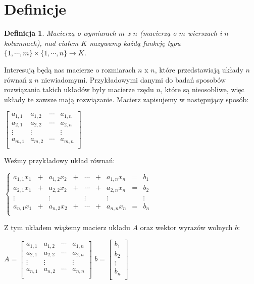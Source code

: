 \documentclass[a4paper,10pt]{article}
\newtheorem{definition}{Definicja}
\begin{document}
\section{Definicje}
\begin{definition}
	Macierzą o wymiarach $m$ x $n$ (macierzą o $m$ wierszach i $n$ kolumnach), nad ciałem $K$ nazywamy każdą funkcję typu $\{1,\cdots,m\} \times \{1,\cdots,n\} \rightarrow K$.
\end{definition}
Interesują będą nas macierze o rozmiarach $n$ x $n$, które przedstawiają układy $n$ równań z $n$ niewiadomymi. Przykładowymi danymi do badań sposobów rozwiązania takich układów były macierze rzędu $n$, które są nieosobliwe, więc układy te zawsze mają rozwiązanie.
Macierz zapisujemy w następujący sposób:
\begin{center}
	$ \left[ \begin{array}{cccc}
		a_{1,1} & a_{1,2} & \cdots & a_{1,n}\\
		a_{2,1} & a_{2,2} & \cdots & a_{2,n}\\
		\vdots  &  \vdots &        & \vdots \\
		a_{m,1} & a_{m,2} & \cdots & a_{m,n}\\
	\end{array} \right] $
\end{center}
\newpage
Weźmy przykładowy układ równań:
\begin{center}
$ \left \{ \begin{array}{ccccccccc}
		a_{1,1}x_{1} & + & a_{1,2}x_{2} & + & \cdots & + & a_{1,n}x_{n} & = & b_{1}\\
		a_{2,1}x_{1} & + & a_{2,2}x_{2} & + & \cdots & + & a_{2,n}x_{n} & = & b_{2}\\
		\vdots & & \vdots & &  \vdots & & \vdots & & \vdots \\
		a_{n,1}x_{1} & + & a_{n,2}x_{2} & + & \cdots & + & a_{n,n}x_{n} & = & b_{n}\\
       \end{array} \right. $
\end{center}
Z tym układem wiążemy macierz układu $A$ oraz wektor wyrazów wolnych $b$:
\begin{center}
$A = \left[ \begin{array}{ccccccccc}
		a_{1,1} & a_{1,2} & \cdots & a_{1,n}\\
		a_{2,1} & a_{2,2} & \cdots & a_{2,n}\\
		\vdots  &  \vdots &        & \vdots \\
		a_{n,1} & a_{n,2} & \cdots & a_{n,n}\\
       \end{array} \right] $
$b = \left[ \begin{array}{c}
		b_{1}\\
		b_{2}\\
		\vdots\\
		b_{n}\\
       \end{array} \right] $
\end{center}
\end{document}

